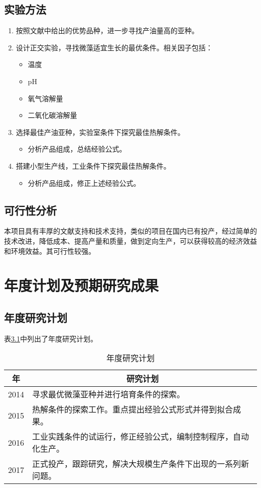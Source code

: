 \documentclass[a4paper,12pt]{report}
\begin{document}
\section{实验方法}
\begin{enumerate}
	\item 按照文献中给出的优势品种，进一步寻找产油量高的亚种。
	\item 设计正交实验，寻找微藻适宜生长的最优条件。相关因子包括：
		\begin{itemize}
			\item 温度
			\item pH
			\item 氧气溶解量
			\item 二氧化碳溶解量
		\end{itemize}
		\item 选择最佳产油亚种，实验室条件下探究最佳热解条件。
		\begin{itemize}
			\item 分析产品组成，总结经验公式。
		\end{itemize}
		\item 搭建小型生产线，工业条件下探究最佳热解条件。
		\begin{itemize}
			\item 分析产品组成，修正上述经验公式。
		\end{itemize}

\end{enumerate}

\section{可行性分析}
本项目具有丰厚的文献支持和技术支持，类似的项目在国内已有投产，经过简单的技术改进，降低成本、提高产量和质量，做到定向生产，可以获得较高的经济效益和环境效益。其可行性较强。

\chapter{年度计划及预期研究成果}
\section{年度研究计划}
表\ref{plan}中列出了年度研究计划。
\begin{table}[H]%
\centering
\begin{tabular}{cl}
\toprule
年&\multicolumn{1}{c}{研究计划}\\
\midrule
2014&寻求最优微藻亚种并进行培育条件的探索。\\
2015&热解条件的探索工作。重点提出经验公式形式并得到拟合成果。\\
2016&工业实践条件的试运行，修正经验公式，编制控制程序，自动化生产。\\
2017&正式投产，跟踪研究，解决大规模生产条件下出现的一系列新问题。\\
\bottomrule

\end{tabular}
\caption{年度研究计划}
\label{plan}
\end{table}
\end{document}
